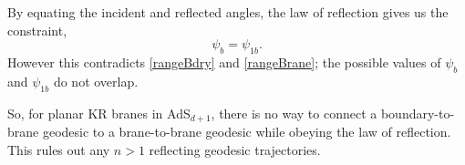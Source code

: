 \documentclass[reprint,amsmath,amssymb,aps,nofootinbib,twocolumn]{revtex4-2}
\begin{document}
\begin{appendix}
By equating the incident and reflected angles, the law of reflection gives us the constraint,
\begin{equation}
\psi_b = \psi_{1b}.
\end{equation}
However this contradicts \eqref{rangeBdry} and \eqref{rangeBrane}; the possible values of $\psi_b$ and $\psi_{1b}$ do not overlap.

So, for planar KR branes in AdS$_{d+1}$, there is no way to connect a boundary-to-brane geodesic to a brane-to-brane geodesic while obeying the law of reflection. This rules out any $n > 1$ reflecting geodesic trajectories.
\end{appendix}



\end{document}
